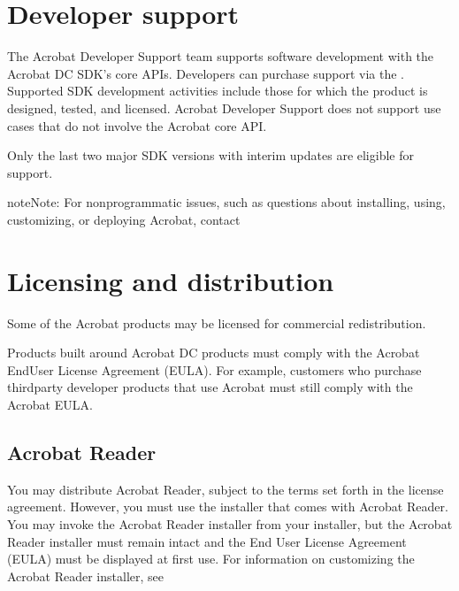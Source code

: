 \documentclass[letterpaper,12pt,english,openany,oneside]{sphinxmanual}
\begin{document}
\section{Developer support}
\label{\detokenize{index:developer-support}}
The Acrobat Developer Support team supports software development with the Acrobat DC SDK’s core APIs. Developers can purchase support via the  . Supported SDK development activities include those for which the product is designed, tested, and licensed. Acrobat Developer Support does not support use cases that do not involve the Acrobat core API.

Only the last two major SDK versions with interim updates are eligible for support.

\begin{sphinxadmonition}{note}{Note:}
For non\sphinxhyphen{}programmatic issues, such as questions about installing, using, customizing, or deploying Acrobat, contact 
\end{sphinxadmonition}




\section{Licensing and distribution}
\label{\detokenize{index:licensing-and-distribution}}
Some of the Acrobat products may be licensed for commercial redistribution.

Products built around Acrobat DC products must comply with the Acrobat End\sphinxhyphen{}User License Agreement (EULA). For example, customers who purchase third\sphinxhyphen{}party developer products that use Acrobat must still comply with the Acrobat EULA.


\subsection{Acrobat Reader}
\label{\detokenize{index:acrobat-reader}}
You may distribute Acrobat Reader, subject to the terms set forth in the license agreement. However, you must use the installer that comes with Acrobat Reader. You may invoke the Acrobat Reader installer from your installer, but the Acrobat Reader installer must remain intact and the End User License Agreement (EULA) must be displayed at first use. For information on customizing the Acrobat Reader installer, see 
\end{document}
